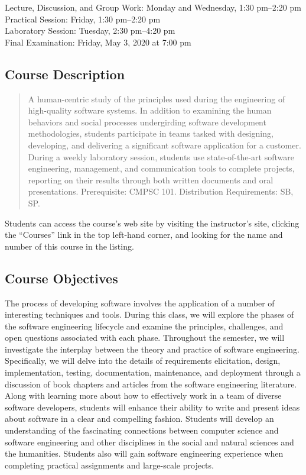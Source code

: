\documentclass[11pt]{article}
\begin{document}
Lecture, Discussion, and Group Work: Monday and Wednesday, 1:30 pm--2:20 pm \\
Practical Session: Friday, 1:30 pm--2:20 pm \\
Laboratory Session: Tuesday, 2:30 pm--4:20 pm \\
Final Examination: Friday, May 3, 2020 at 7:00 pm

\subsection*{Course Description}

\begin{quote}

A human-centric study of the principles used during the engineering of
high-quality software systems. In addition to examining the human behaviors and
social processes undergirding software development methodologies, students
participate in teams tasked with designing, developing, and delivering a
significant software application for a customer. During a weekly laboratory
session, students use state-of-the-art software engineering, management, and
communication tools to complete projects, reporting on their results through
both written documents and oral presentations. Prerequisite: CMPSC
101. Distribution Requirements: SB, SP.\@ \\

\end{quote}

\noindent Students can access the course's web site by visiting the instructor's
site, clicking the ``Courses'' link in the top left-hand corner, and looking for
the name and number of this course in the listing.

\subsection*{Course Objectives}

The process of developing software involves the application of a number of
interesting techniques and tools. During this class, we will explore the phases
of the software engineering lifecycle and examine the principles, challenges,
and open questions associated with each phase. Throughout the semester, we will
investigate the interplay between the theory and practice of software
engineering. Specifically, we will delve into the details of requirements
elicitation, design, implementation, testing, documentation, maintenance, and
deployment through a discussion of book chapters and articles from the software
engineering literature. Along with learning more about how to effectively work
in a team of diverse software developers, students will enhance their ability
to write and present ideas about software in a clear and compelling fashion.
Students will develop an understanding of the fascinating connections between
computer science and software engineering and other disciplines in the social
and natural sciences and the humanities. Students also will gain software
engineering experience when completing practical assignments and large-scale
projects.
\end{document}
